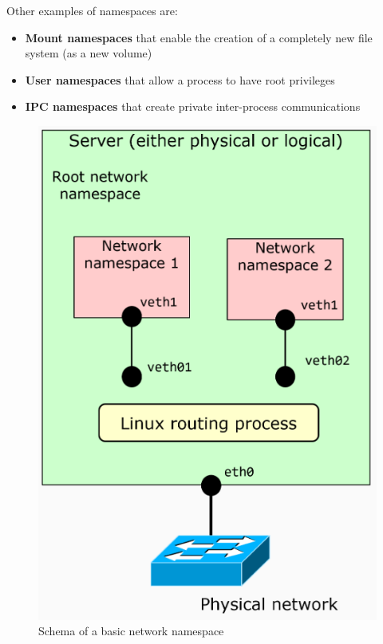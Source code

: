 Other examples of namespaces are:
\begin{itemize}
    \item \textbf{Mount namespaces} that enable the creation of a completely new file system (as a new volume)
    \item \textbf{User namespaces} that allow a process to have root privileges
    \item \textbf{IPC namespaces} that create private inter-process communications
\end{itemize} 

\begin{figure}[H]
    \centering
    \includegraphics[scale=0.3]{images/netnamespace.png}
    \caption{Schema of a basic network namespace}
    \label{fig:netnamespace}
\end{figure}

